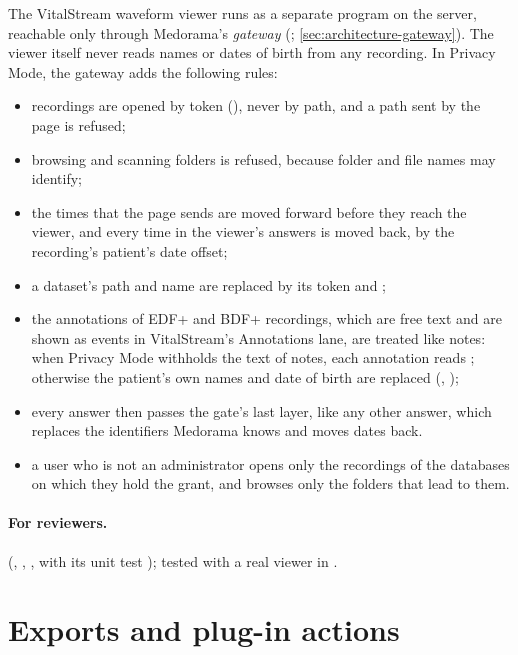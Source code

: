 The VitalStream waveform viewer runs as a separate program on the server, reachable only through
Medorama's \emph{gateway} (; \cref{sec:architecture-gateway}). The viewer itself
never reads names or dates of birth from any recording. In Privacy Mode, the gateway adds the
following rules:
\begin{itemize}
\item recordings are opened by token (), never by path, and a path sent by the
  page is refused;
\item browsing and scanning folders is refused, because folder and file names may identify;
\item the times that the page sends are moved forward before they reach the viewer, and every
  time in the viewer's answers is moved back, by the recording's patient's date offset;
\item a dataset's path and name are replaced by its token and \code{[Recording]};
\item the annotations of EDF+ and BDF+ recordings, which are free text and are shown as events in
  VitalStream's Annotations lane, are treated like notes: when Privacy Mode withholds the text of
  notes, each annotation reads \code{[Annotation]}; otherwise the patient's own names and date of
  birth are replaced (, );
\item every answer then passes the gate's last layer, like any other answer, which replaces the
  identifiers Medorama knows and moves dates back.
\item a user who is not an administrator opens only the recordings of the databases on which they
  hold the  grant, and browses only the folders that lead to them.
\end{itemize}

\paragraph{For reviewers.}  (, ,
, with its unit test ); tested with a
real viewer in .

\section{Exports and plug-in actions}
\label{sec:protecting-exports}

